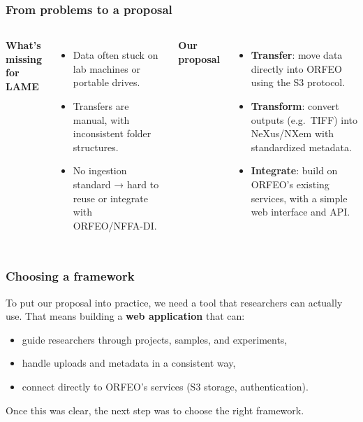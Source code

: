 \documentclass{beamer}
\begin{document}
	\begin{frame}
		\frametitle{From problems to a proposal}
		
		\begin{columns}[T,totalwidth=\textwidth]
			\textbf{What’s missing for LAME}
			\begin{itemize}
				\item Data often stuck on lab machines or portable drives.
				\item Transfers are manual, with inconsistent folder structures.
				\item No ingestion standard → hard to reuse or integrate with ORFEO/NFFA-DI.
			\end{itemize}
			
			\textbf{Our proposal}
			\begin{itemize}
				\item \textbf{Transfer}: move data directly into ORFEO using the S3 protocol.
				\item \textbf{Transform}: convert outputs (e.g.\ TIFF) into NeXus/NXem with standardized metadata.
				\item \textbf{Integrate}: build on ORFEO’s existing services, with a simple web interface and API.
			\end{itemize}
		\end{columns}
	\end{frame}
	
	\begin{frame}
		\frametitle{Choosing a framework}
		
		To put our proposal into practice, we need a tool that researchers can actually use.  
		That means building a \textbf{web application} that can:
		
		\vspace{1em}
		\begin{itemize}
			\item guide researchers through projects, samples, and experiments,
			\item handle uploads and metadata in a consistent way,
			\item connect directly to ORFEO’s services (S3 storage, authentication).
		\end{itemize}
		
		Once this was clear, the next step was to choose the right framework.
	\end{frame}
	
\end{document}
